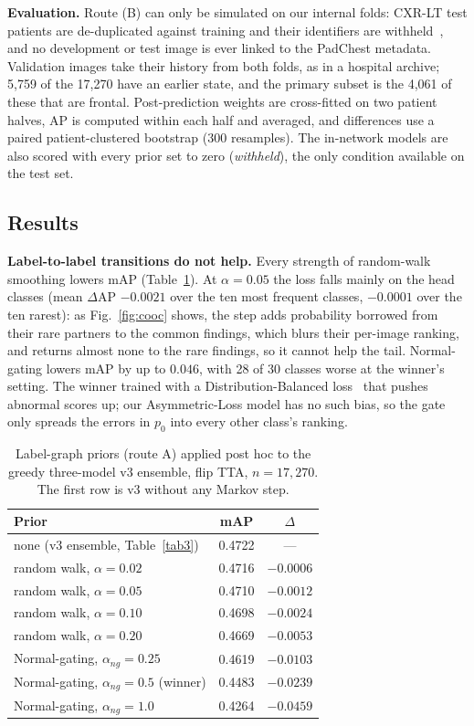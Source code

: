 \documentclass[conference]{IEEEtran}
\begin{document}
\textbf{Evaluation.} Route (B) can only be simulated on our internal folds: CXR-LT test patients are de-duplicated against training and their identifiers are withheld~\cite{b14}, and no development or test image is ever linked to the PadChest metadata. Validation images take their history from both folds, as in a hospital archive; 5,759 of the 17,270 have an earlier state, and the primary subset is the 4,061 of these that are frontal. Post-prediction weights are cross-fitted on two patient halves, AP is computed within each half and averaged, and differences use a paired patient-clustered bootstrap (300 resamples). The in-network models are also scored with every prior set to zero (\emph{withheld}), the only condition available on the test set.

\subsection{Results}
\label{sec:mk-results}
\textbf{Label-to-label transitions do not help.} Every strength of random-walk smoothing lowers mAP (Table~\ref{tab:mk-graph}). At $\alpha = 0.05$ the loss falls mainly on the head classes (mean $\Delta$AP $-0.0021$ over the ten most frequent classes, $-0.0001$ over the ten rarest): as Fig.~\ref{fig:cooc} shows, the step adds probability borrowed from their rare partners to the common findings, which blurs their per-image ranking, and returns almost none to the rare findings, so it cannot help the tail. Normal-gating lowers mAP by up to $0.046$, with 28 of 30 classes worse at the winner's setting. The winner trained with a Distribution-Balanced loss~\cite{b23} that pushes abnormal scores up; our Asymmetric-Loss model has no such bias, so the gate only spreads the errors in $p_0$ into every other class's ranking.

\begin{table}[htbp]
\caption{Label-graph priors (route A) applied post hoc to the greedy three-model v3 ensemble, flip TTA, $n = 17{,}270$. The first row is v3 without any Markov step.}
\begin{center}
\begin{tabular}{|l|c|c|}
\hline
\textbf{Prior} & \textbf{mAP} & \textbf{$\Delta$} \\
\hline
none (v3 ensemble, Table~\ref{tab3}) & 0.4722 & --- \\
\hline
random walk, $\alpha = 0.02$ & 0.4716 & $-0.0006$ \\
random walk, $\alpha = 0.05$ & 0.4710 & $-0.0012$ \\
random walk, $\alpha = 0.10$ & 0.4698 & $-0.0024$ \\
random walk, $\alpha = 0.20$ & 0.4669 & $-0.0053$ \\
\hline
Normal-gating, $\alpha_{ng} = 0.25$ & 0.4619 & $-0.0103$ \\
Normal-gating, $\alpha_{ng} = 0.5$ (winner) & 0.4483 & $-0.0239$ \\
Normal-gating, $\alpha_{ng} = 1.0$ & 0.4264 & $-0.0459$ \\
\hline
\end{tabular}
\label{tab:mk-graph}
\end{center}
\end{table}
\end{document}
